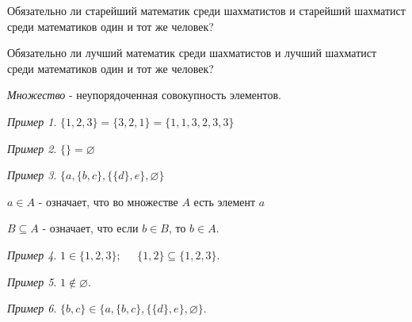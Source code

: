 \documentclass{article}
\theoremstyle{remark}
\newtheorem{example}{Пример}
\begin{document}
\large


\setcounter{task}{0}

\begin{task}
	Обязательно ли старейший математик среди шахматистов и старейший шахматист среди математиков один и тот же человек?
\end{task}

\begin{task}
	Обязательно ли лучший математик среди шахматистов и лучший шахматист среди математиков один и тот же человек?
\end{task}

\begin{definition}
	\textit{Множество} - неупорядоченная совокупность элементов.
\end{definition}

\begin{example}
$\{1,2,3\} = \{3,2,1\} = \{1,1,3,2,3,3\}$
\end{example}

\begin{example}
	 $\{\} =\varnothing$
 \end{example}

\begin{example}
	$\{a,\{b,c\},\{\{d\},e\},\varnothing\}$
\end{example}

\begin{definition}
	$a \in A$ - означает, что во множестве $A$ есть элемент $a$
\end{definition}

\begin{definition}
	$B \subseteq A$ - означает, что если $b \in B$, то $b \in A$.
\end{definition}

\begin{example}
	$1\in\{1,2,3\}; \;\;\;\;\; \{1,2\}\subseteq\{1,2,3\}$.
\end{example}

\begin{example}
	$1\notin\varnothing$.
\end{example}

\begin{example}
	$\{b,c\}\in \{a,\{b,c\},\{\{d\},e\},\varnothing\}$.
\end{example}
\end{document}
